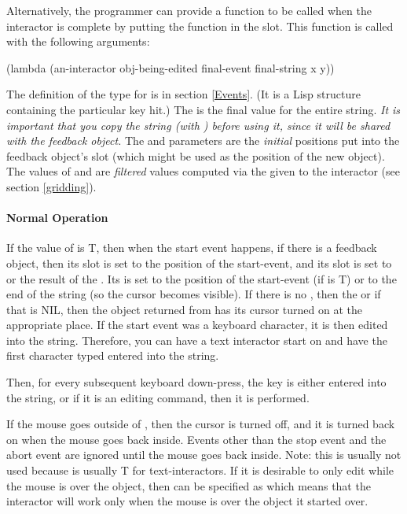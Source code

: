 Alternatively, the programmer can provide a function to be called when the
interactor is complete by putting the function in the 
slot.  This function is called with the following arguments:
\begin{programexample}
(lambda (an-interactor obj-being-edited final-event final-string x y))
\end{programexample}
The definition of the type for  is in section \ref{Events}.
(It is a Lisp structure containing the particular key hit.)
The  is the final value for the entire string.  {\it It is
important that you copy the string (with ) before using it,
since it will be shared with the feedback object.}
The  and  parameters are the {\it initial} positions put into the
feedback object's  slot (which might be used as the position of the
new object).  The values of  and  are {\it filtered} values computed
via the  given to the interactor (see section
\ref{gridding}).


\paragraph{Normal Operation}
If the value of  is T,
then when the start event happens, if there is a feedback object, then its
 slot is set to the position of the start-event, and its
 slot is set to  or the result of the
.  Its  is set to the
position of the start-event (if  is T) or to the
end of the string (so the cursor becomes visible).  If there is no
, then the  or if that is NIL, then
the object returned from  has its cursor turned on at the
appropriate place.  If the start event was a keyboard character, it is then
edited into the string.  Therefore, you can have a text interactor start on
 and have the first character typed entered into the string.

Then, for every subsequent keyboard down-press, the key is either entered
into the string, or if it is an editing command, then it is performed.

If the mouse goes outside of , then the cursor is turned
off, and it is turned back on when the mouse goes back inside.  Events
other than the stop event and the abort event are ignored until the mouse
goes back inside.  Note: this
is usually not used because  is usually T for
text-interactors.  If
it is desirable to only edit while the mouse is
over the object, then  can be specified as 
which means that the interactor will work only when the mouse is over the
object it started over.

